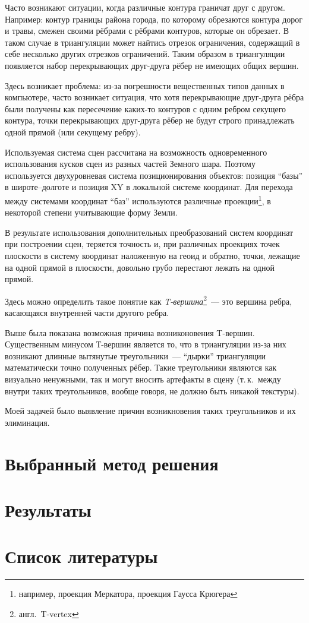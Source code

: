 \documentclass[a4paper,10pt,titlepage]{report}
\begin{document}
Часто возникают ситуации, когда различные контура граничат друг с другом.
Например: контур границы района города, по которому обрезаются контура дорог и травы,
смежен своими рёбрами с рёбрами контуров, которые он обрезает.
В таком случае в триангуляции может найтись отрезок ограничения,
содержащий в себе несколько других отрезков ограничений.
Таким образом в триангуляции появляется набор перекрывающих друг-друга рёбер не имеющих общих вершин.

Здесь возникает проблема: из-за погрешности вещественных типов данных в компьютере,
часто возникает ситуация, что хотя перекрывающие друг-друга рёбра были получены как пересечение
каких-то контуров с одним ребром секущего контура, 
точки перекрывающих друг-друга рёбер не будут строго принадлежать одной прямой (или секущему ребру).

Используемая система сцен рассчитана на возможность одновременного использования кусков сцен из разных частей Земного шара.
Поэтому используется двухуровневая система позиционирования объектов: 
позиция ``базы'' в широте--долготе и позиция XY в локальной системе координат.
Для перехода между системами координат ``баз'' используются различные проекции\footnote{например, проекция Меркатора, проекция Гаусса Крюгера}, в некоторой степени учитывающие форму Земли.

В результате использования дополнительных преобразований систем координат при построении сцен, 
теряется точность 
и, при различных проекциях точек плоскости в систему координат наложенную на геоид и обратно,
точки, лежащие на одной прямой в плоскости, довольно грубо перестают лежать на одной прямой.

Здесь можно определить такое понятие как \textit{T-вершина}\footnote{англ.~T-vertex}~--- 
это вершина ребра, касающаяся внутренней части другого ребра.

Выше была показана возможная причина возниконовения T-вершин.
Существенным минусом Т-вершин является то, 
что в триангуляции из-за них возникают длинные вытянутые треугольники~--- 
``дырки'' триангуляции математически точно полученных рёбер.
Такие треугольники являются как визуально ненужными, 
так и могут вносить артефакты в сцену
(т.\,к.~между внутри таких треугольников, вообще говоря, не должно быть никакой текстуры).

Моей задачей было выявление причин возникновения таких треугольников и их элиминация.

\section*{Выбранный метод решения}
\section*{Результаты}
\section*{Список литературы}
\end{document}
